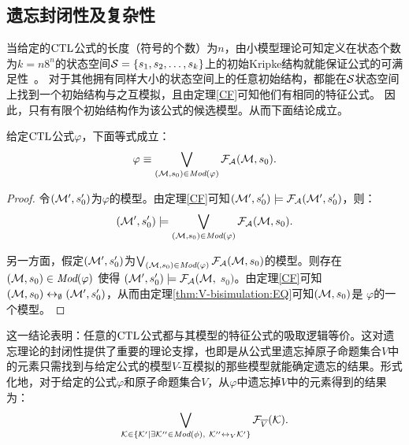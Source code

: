 \subsection{遗忘封闭性及复杂性}\label{chapter06:sec:close}
当给定的$\textrm{CTL}$公式的长度（符号的个数）为$n$，由小模型理论可知定义在状态个数为$k=n8^n$的状态空间${\cal S}=\{s_1,s_2,\dots, s_k\}$上的初始Kripke结构就能保证公式的可满足性~\cite{DBLP:journals/jcss/EmersonH85}。
对于其他拥有同样大小的状态空间上的任意初始结构，都能在${\cal S}$状态空间上找到一个初始结构与之互模拟，且由定理\ref{CF}可知他们有相同的特征公式。
因此，只有有限个初始结构作为该公式的候选模型。从而下面结论成立。

\begin{lemma}\label{lem:models:formula}
	给定$\textrm{CTL}$公式$\varphi$，下面等式成立：
	\begin{equation*}
		\varphi\equiv \bigvee_{({\cal M}, s_0)\in\textit{Mod}(\varphi)}{\cal F}_{\cal A}({\cal M}, s_0).
	\end{equation*}
\end{lemma}
\begin{proof}
	令$({\cal M}', s_0')$为$\varphi$的模型。由定理\ref{CF}可知$({\cal M}', s_0') \models {\cal F}_{{\cal A}}({\cal M}', s_0')$，则：
	$$({\cal M}', s_0') \models \bigvee_{({\cal M}, s_0)\in \textit{Mod}(\varphi)} {\cal F}_{{\cal A}}({\cal M}, s_0).$$
	
	另一方面，假定$({\cal M}', s_0')$为$\bigvee_{({\cal M}, s_0)\in \textit{Mod}(\varphi)} {\cal F}_{{\cal A}}({\cal M}, s_0)$的模型。则存在$({\cal M}, s_0)\in \textit{Mod}(\varphi)$ 使得 $({\cal M}', s_0') \models {\cal F}_{{\cal A}}({\cal M},$ $s_0)$。由定理\ref{CF}可知$({\cal M}, s_0) \leftrightarrow_{\emptyset} ({\cal M}', s_0')$，从而由定理\ref{thm:V-bisimulation:EQ}可知$({\cal M}, s_0)$是 $\varphi$的一个模型。
\end{proof}

这一结论表明：任意的$\textrm{CTL}$公式都与其模型的特征公式的吸取逻辑等价。这对遗忘理论的封闭性提供了重要的理论支撑，也即是从公式里遗忘掉原子命题集合$V$中的元素只需找到与给定公式的模型$V$-互模拟的那些模型就能确定遗忘的结果。形式化地，对于给定的公式$\varphi$和原子命题集合$V$，从$\varphi$中遗忘掉$V$中的元素得到的结果为：
\begin{equation*}
	\bigvee_{{\cal K}\in  \{{\cal K}'\mid \exists {\cal K}''\in\textit{Mod}(\phi),\ {\cal K}''\leftrightarrow_V{\cal K}'\}} {\cal F}_{\overline V}({\cal K}).
\end{equation*}



